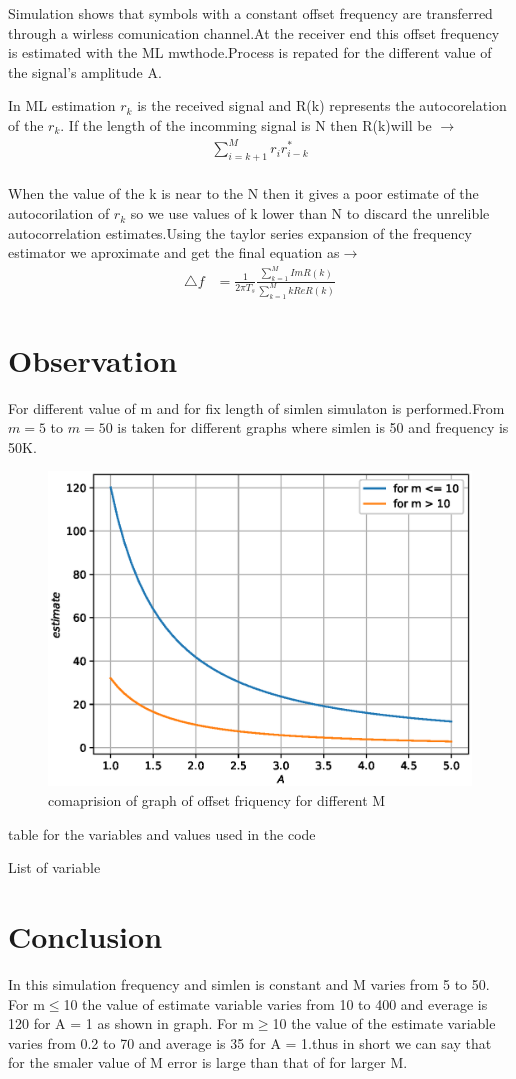 \documentclass[journal,12pt,onecolumn]{IEEEtran}
\begin{document}
	 Simulation shows that symbols with a constant offset frequency are transferred through a wirless comunication channel.At the receiver end this offset frequency is estimated with the ML mwthode.Process is repated for the different value of the signal's amplitude A.
	
	In ML estimation $r_k$ is the received signal and R(k) represents the autocorelation of the  $r_k$. If the length of the incomming signal is N then R(k)will be $\to$
	\\
	\begin{align}
		{\sum_{i = k+1}^{M} r_ir_{i-k}^*}
	\end{align}
	\\
	When the value of the k is near to the N then it gives a poor estimate of the autocorilation of $r_k$ so we use values of k lower than N to discard the unrelible autocorrelation estimates.Using the taylor series expansion of the frequency estimator we  aproximate  and get the final equation as$\to$ 
	\\
	\begin{align}
	\triangle f &= \frac{1}{2\pi T_s}\frac{\sum_{k=1}^{M} Im{R(k)}}{\sum_{k=1}^{M} kRe{R(k)}}
	\end{align}	

\section{Observation}

	
	For different value of m and for fix length of simlen simulaton is performed.From $m =5$ to $m= 50$ is taken for  different graphs where simlen is 50 and frequency is 50K.

\begin{figure}[!ht]
	\centering
	\includegraphics[width=0.5\columnwidth]{./comparision/frequency.eps}
	\caption{comaprision of graph of offset friquency for different M }
	\label{fig:offset frequency}
\end{figure}
table for the variables and values used in the code
\begin{table}[!ht]
	
	\caption{List of variable }
\end{table}

\section{Conclusion}
	 In this simulation frequency and simlen is constant and M varies from 5 to 50. For  m$\leq$10  the value of  estimate variable  varies from 10 to 400 and everage is 120 for A = 1 as shown in graph. For m$\geq$10  the value of the estimate variable  varies from 0.2 to 70 and average is 35 for A = 1.thus in short we can say that for the smaler value of M error is large than that of for larger M.
\end{document}
